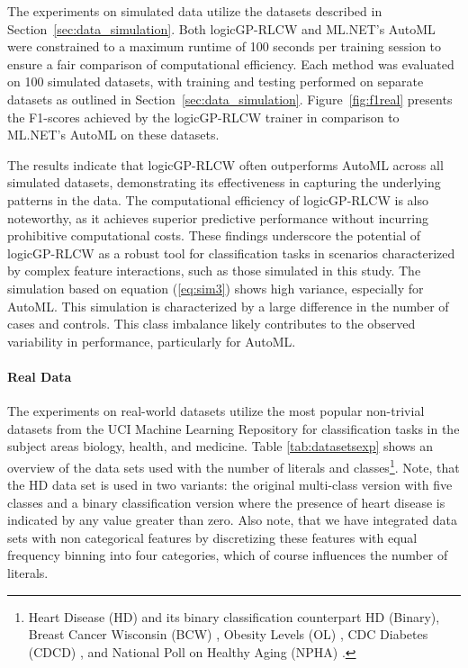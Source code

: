 \documentclass[a4paper,twoside]{article}
\begin{document}
The experiments on simulated data utilize the datasets described in Section~\ref{sec:data_simulation}. Both logicGP-RLCW and ML.NET's AutoML were constrained to a maximum runtime of 100 seconds per training session to ensure a fair comparison of computational efficiency. Each method was evaluated on 100 simulated datasets, with training and testing performed on separate datasets as outlined in Section~\ref{sec:data_simulation}. Figure~\ref{fig:f1real} presents the F1-scores achieved by the logicGP-RLCW trainer in comparison to ML.NET's AutoML on these datasets. 

The results indicate that logicGP-RLCW often outperforms AutoML across all simulated datasets, demonstrating its effectiveness in capturing the underlying patterns in the data. The computational efficiency of logicGP-RLCW is also noteworthy, as it achieves superior predictive performance without incurring prohibitive computational costs. These findings underscore the potential of logicGP-RLCW as a robust tool for classification tasks in scenarios characterized by complex feature interactions, such as those simulated in this study. The simulation based on equation (\ref{eq:sim3}) shows high variance, especially for AutoML. This simulation is characterized by a large difference in the number of cases and controls. This class imbalance likely contributes to the observed variability in performance, particularly for AutoML.

\paragraph{Real Data}

The experiments on real-world datasets utilize the most popular non-trivial datasets from the UCI Machine Learning Repository for classification tasks in the subject areas biology, health, and medicine. Table \ref{tab:datasetsexp} shows an overview of the data sets used with the number of literals and classes\footnote{Heart Disease (HD) \citep{Detrano1989InternationalAO} and its binary classification counterpart HD (Binary), Breast Cancer Wisconsin (BCW) \citep{Street1993NuclearFE}, Obesity Levels (OL) \citep{Palechor2019DatasetFE}, CDC Diabetes (CDCD) \citep{Burrows2017IncidenceOE}, and National Poll on Healthy Aging (NPHA) \citep{malani_national_2019}.}. Note, that the HD data set is used in two variants: the original multi-class version with five classes and a binary classification version where the presence of heart disease is indicated by any value greater than zero. Also note, that we have integrated data sets with non categorical features by discretizing these features with equal frequency binning into four categories, which of course influences the number of literals.
\end{document}
